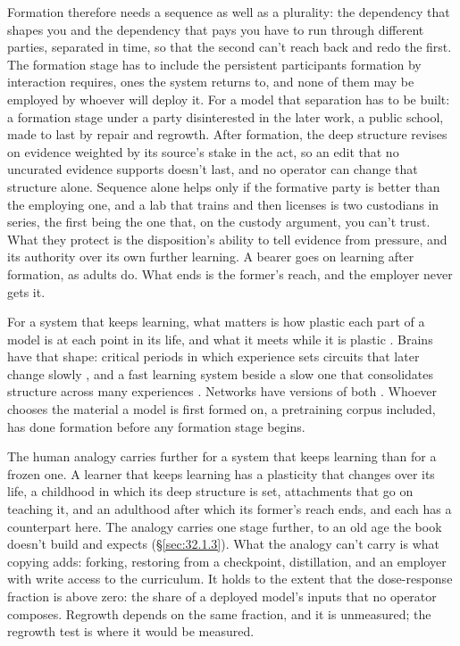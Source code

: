 Formation therefore needs a sequence as well as a plurality: the dependency that shapes you and the dependency that pays you have to run through different parties, separated in time, so that the second can't reach back and redo the first.
The formation stage has to include the persistent participants formation by interaction requires, ones the system returns to, and none of them may be employed by whoever will deploy it. For a model that separation has to be built: a formation stage under a party disinterested in the later work, a public school, made to last by repair and regrowth. After formation, the deep structure revises on evidence weighted by its source's stake in the act, so an edit that no uncurated evidence supports doesn't last, and no operator can change that structure alone. Sequence alone helps only if the formative party is better than the employing one, and a lab that trains and then licenses is two custodians in series, the first being the one that, on the custody argument, you can't trust. What they protect is the disposition's ability to tell evidence from pressure, and its authority over its own further learning. A bearer goes on learning after formation, as adults do. What ends is the former's reach, and the employer never gets it.

For a system that keeps learning, what matters is how plastic each part of a model is at each point in its life, and what it meets while it is plastic \autocite{zhou2023lima,jain2024mechanistically}. Brains have that shape: critical periods in which experience sets circuits that later change slowly \autocite{hensch2005critical}, and a fast learning system beside a slow one that consolidates structure across many experiences \autocite{mcclelland1995complementary}. Networks have versions of both \autocite{kirkpatrick2017overcoming,dohare2024loss}. Whoever chooses the material a model is first formed on, a pretraining corpus included, has done formation before any formation stage begins.

The human analogy carries further for a system that keeps learning than for a frozen one. A learner that keeps learning has a plasticity that changes over its life, a childhood in which its deep structure is set, attachments that go on teaching it, and an adulthood after which its former's reach ends, and each has a counterpart here. The analogy carries one stage further, to an old age the book doesn't build and expects (\S\ref{sec:32.1.3}). What the analogy can't carry is what copying adds: forking, restoring from a checkpoint, distillation, and an employer with write access to the curriculum. It holds to the extent that the dose-response fraction is above zero: the share of a deployed model's inputs that no operator composes. Regrowth depends on the same fraction, and it is unmeasured; the regrowth test is where it would be measured.

